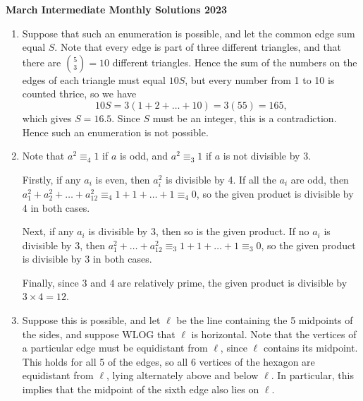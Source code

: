 \documentclass{article}
\begin{document}
\thispagestyle{empty}

\begin{center}
  \textbf{\Large March Intermediate Monthly Solutions 2023}
  \\ \vspace{1em}
\end{center}

\bigskip

\begin{enumerate}
\item Suppose that such an enumeration is possible, and let the common edge sum equal $S$. Note that every edge is part of three different triangles, and that there are ${5 \choose 3} = 10$ different triangles. Hence the sum of the numbers on the edges of each triangle must equal $10S$, but every number from 1 to 10 is counted thrice, so we have 
$$10S = 3(1+2+\dots+10) = 3(55) = 165,$$
which gives $S = 16.5$. Since $S$ must be an integer, this is a contradiction. Hence such an enumeration is not possible. 

\item Note that $a^2 \equiv_4 1$ if $a$ is odd, and $a^2 \equiv_3 1$ if $a$ is not divisible by 3. 

Firstly, if any $a_i$ is even, then $a_i^2$ is divisible by 4. If all the $a_i$ are odd, then $a_1^2 + a_2^2 + \dots +a_{12}^2 \equiv_4 1 + 1 + \dots + 1 \equiv_4 0$, so the given product is divisible by 4 in both cases. 

Next, if any $a_i$ is divisible by 3, then so is the given product. If no $a_i$ is divisible by 3, then $a_1^2+\dots+a_{12}^2 \equiv_{3} 1+1+\dots+1 \equiv_3 0$, so the given product is divisible by 3 in both cases.

Finally, since $3$ and $4$ are relatively prime, the given product is divisible by $3\times 4 = 12$. 

\item 

Suppose this is possible, and let $\ell$ be the line containing the 5 midpoints of the sides, and suppose WLOG that $\ell$ is horizontal. Note that the vertices of a particular edge must be equidistant from $\ell$, since $\ell$ contains its midpoint. This holds for all 5 of the edges, so all 6 vertices of the hexagon are equidistant from $\ell$, lying alternately above and below $\ell$. In particular, this implies that the midpoint of the sixth edge also lies on $\ell$.

\centerline{}


\end{enumerate}
\end{document}
